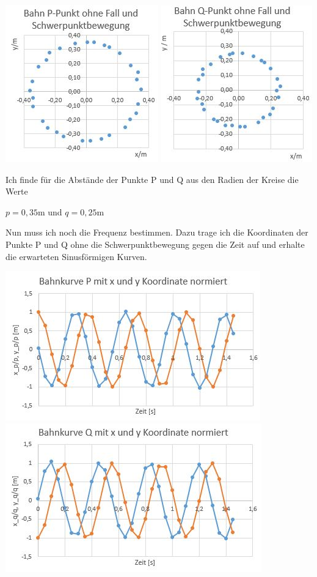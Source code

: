 \documentclass{article}
\begin{document}
\begin{center}
	\includegraphics[scale=0.6]{Kreis-P.JPG}
	\includegraphics[scale=0.6]{Kreis-Q.JPG}
\end{center}
Ich finde für die Abstände der Punkte P und Q aus den Radien der Kreise die Werte 
\begin{center}
	$p=0,35$m und $q=0,25$m
\end{center}
Nun muss ich noch die Frequenz bestimmen. Dazu trage ich die Koordinaten der Punkte P und Q ohne die Schwerpunktbewegung gegen die Zeit auf 
und erhalte die erwarteten Sinusförmigen Kurven.   
\begin{center}
	\includegraphics[scale=0.5]{Sinus-P.JPG}
	\includegraphics[scale=0.5]{Sinus-Q.JPG}
\end{center}
\end{document}
